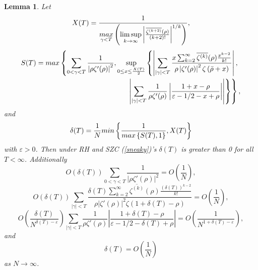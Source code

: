\documentclass[11pt,article]{amsart}
\numberwithin{equation}{section}
\newtheorem{lemma}{Lemma}
\numberwithin{equation}{section}
\numberwithin{lemma}{section}
\numberwithin{prop}{section}
\begin{document}
\begin{lemma}
Let
\begin{equation}
X(T)=\frac{1}{\underset{\gamma<T}{\textnormal{max}}\left(\underset{k\rightarrow \infty}{\lim\sup}\left|\frac{\overline{\zeta^{(k+2)}}(\rho)}{(k+2)!}\right|^{1/k}\right)},  \label{x bound}
\end{equation}
\begin{align}
S(T)=\textnormal{max}\left\{\sum_{0<\gamma<T}\frac{1}{\left|\rho\zeta'(\rho)\right|^{2}},\sup_{0\leq x \leq \frac{X(T)}{2}}\left\{\left|\sum_{\left|\gamma\right|<T}\frac{x\sum_{k=2}^{\infty}\overline{\zeta^{(k)}}(\rho)\frac{x^{k-2}}{k!}}{\rho\left|\zeta'(\rho)\right|^{2}\zeta\left(\bar{\rho}+x\right)}\right|, \right. \right. \nonumber \\ \left. \left. \left|\sum_{\left|\gamma\right|<T}\frac{1}{\rho\zeta'(\rho)}\left|\frac{1+x-\rho}{\varepsilon-1/2-x+\rho}\right|\right|\right\} \right\},
\label{da sup}
\end{align}
and
\begin{equation}
\delta(T)=\frac{1}{N}\textnormal{min}\left\{\frac{1}{\textnormal{max}\left\{S(T),1\right\}},X(T)\right\} \label{sneaky}
\end{equation}
with $\varepsilon>0$. Then under RH and SZC (\ref{sneaky})'s $\delta(T)$ is greater than 0 for all $T<\infty$. Additionally 
\begin{equation}
O\left(\delta(T)\right)\sum_{0<\gamma<T}\frac{1}{\left|\rho\zeta'(\rho)\right|^{2}}=O\left(\frac{1}{N}\right), \label{probterm1}
\end{equation}
\begin{equation}
O\left(\delta(T)\right)\sum_{\left|\gamma\right|<T}\frac{\delta(T)\sum_{k=2}^{\infty}\overline{\zeta^{(k)}}(\rho)\frac{\left(\delta(T)\right)^{k-2}}{k!}}{\rho \left|\zeta'(\rho)\right|^{2}\zeta\left(1+\delta(T)-\rho\right)}=O\left(\frac{1}{N}\right), \label{probterm2}
\end{equation}
\begin{equation}
O\left(\frac{\delta(T)}{N^{\delta(T)-\varepsilon}}\right)\sum_{\left|\gamma\right|<T}\frac{1}{\rho\zeta'(\rho)}\left|\frac{1+\delta(T)-\rho}{\varepsilon-1/2-\delta(T)+\rho}\right|=O\left(\frac{1}{N^{1+\delta(T)-\varepsilon}}\right), \label{probterm3}
\end{equation}
and 
\begin{equation}
\delta(T)=O\left(\frac{1}{N}\right) \label{sneaked}
\end{equation}
as $N\rightarrow \infty$. 
\label{delta lemma}
\end{lemma}
\end{document}
